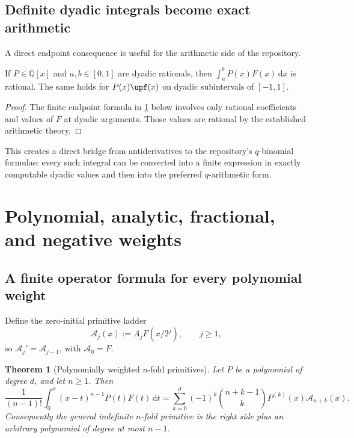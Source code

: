 \documentclass[11pt,oneside]{article}
\newtheorem{theorem}{Theorem}[section]
\theoremstyle{definition}
\theoremstyle{remark}
\newcommand{\dd}{\,\mathrm d}
\newcommand{\1}{\mathbf 1}
\begin{document}
\subsection{Definite dyadic integrals become exact arithmetic}

A direct endpoint consequence is useful for the arithmetic side of the repository.

\begin{corollary}
If \(P\in\mathbb Q[x]\) and \(a,b\in[0,1]\) are dyadic rationals, then
\(
 \int_a^bP(x)F(x)\dd x
\)
is rational.  The same holds for \(P(x)\upf(x)\) on dyadic subintervals of
\([-1,1]\).
\end{corollary}

\begin{proof}
The finite endpoint formula in \cref{p6:thm:polynomial-primitive} below involves only
rational coefficients and values of \(F\) at dyadic arguments.  Those values are
rational by the established arithmetic theory.
\end{proof}

This creates a direct bridge from antiderivatives to the repository's
\(q\)-binomial formulae: every such integral can be converted into a finite expression
in exactly computable dyadic values and then into the preferred \(q\)-arithmetic form.

\section{Polynomial, analytic, fractional, and negative weights}

\subsection{A finite operator formula for every polynomial weight}

Define the zero-initial primitive ladder
\begin{equation}
 \mathcal A_j(x):=A_jF(x/2^j),\qquad j\ge1,                \label{p6:eq:Aj-ladder}
\end{equation}
so \(\mathcal A_j'=\mathcal A_{j-1}\), with
\(\mathcal A_0=F\).

\begin{theorem}[Polynomially weighted \(n\)-fold primitives]
\label{p6:thm:polynomial-primitive}
Let \(P\) be a polynomial of degree \(d\), and let \(n\ge1\).  Then
\begin{equation}
 \boxed{
 \frac1{(n-1)!}\int_0^x(x-t)^{n-1}P(t)F(t)\dd t
 =\sum_{k=0}^{d}(-1)^k\binom{n+k-1}{k}
   P^{(k)}(x)\mathcal A_{n+k}(x).
 }                                                        \label{p6:eq:poly-nfold}
\end{equation}
Consequently the general indefinite \(n\)-fold primitive is the right side plus an
arbitrary polynomial of degree at most \(n-1\).
\end{theorem}
\end{document}
